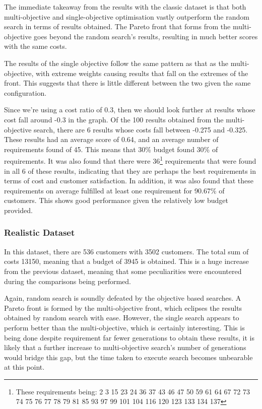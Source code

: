 \documentclass[11pt, a4paper]{article}
\begin{document}
The immediate takeaway from the results with the classic dataset is that both
multi-objective and single-objective optimisation vastly outperform the random
search in terms of results obtained. The Pareto front that forms from the
multi-objective goes beyond the random search's results, resulting in much
better scores with the same costs.

The results of the single objective follow the same pattern as that as the
multi-objective, with extreme weights causing results that fall on the extremes
of the front. This suggests that there is little different between the two given
the same configuration.

Since we're using a cost ratio of 0.3, then we should look further at results
whose cost fall around -0.3 in the graph. Of the 100 results obtained from the
multi-objective search, there are 6 results whose costs fall between -0.275 and
-0.325. These results had an average score of 0.64, and an average number of
requirements found of 45. This means that 30\% budget found 30\% of
requirements. It was also found that there were 36\footnote{These requirements
being: 2 3 15 23 24 36 37 43 46 47 50 59 61 64 67 72 73 74 75 76 77 78 79 81 85
93 97 99 101 104 116 120 123 133 134 137} requirements that were found in all 6
of these results, indicating that they are perhaps the best requirements in
terms of cost and customer satisfaction. In addition, it was also found that
these requirements on average fulfilled at least one requirement for 90.67\% of
customers. This shows good performance given the relatively low budget provided.

\subsubsection{Realistic Dataset} %
\label{ssub:realistic_dataset}
In this dataset, there are 536 customers with 3502 customers. The total sum of
costs 13150, meaning that a budget of 3945 is obtained. This is a huge increase
from the previous dataset, meaning that some peculiarities were encountered
during the comparisons being performed.

Again, random search is soundly defeated by the objective based searches. A
Pareto front is formed by the multi-objective front, which eclipses the results
obtained by random search with ease. However, the single search appears to
perform better than the multi-objective, which is certainly interesting. This
is being done despite requirement far fewer generations to obtain these results,
it is likely that a further increase to multi-objective search's number of
generations would bridge this gap, but the time taken to execute search becomes
unbearable at this point.
\end{document}
